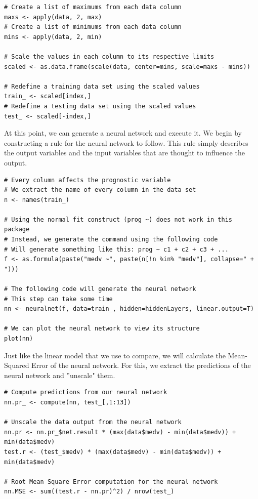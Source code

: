 \documentclass[11pt]{article}
\begin{document}
\begin{lstlisting}
# Create a list of maximums from each data column
maxs <- apply(data, 2, max)
# Create a list of minimums from each data column
mins <- apply(data, 2, min)

# Scale the values in each column to its respective limits
scaled <- as.data.frame(scale(data, center=mins, scale=maxs - mins))

# Redefine a training data set using the scaled values
train_ <- scaled[index,]
# Redefine a testing data set using the scaled values
test_ <- scaled[-index,]
\end{lstlisting}

At this point, we can generate a neural network and execute it. We begin by constructing a rule for the neural network to follow. This rule simply describes the output variables and the input variables that are thought to influence the output. 

\begin{lstlisting}
# Every column affects the prognostic variable
# We extract the name of every column in the data set
n <- names(train_)

# Using the normal fit construct (prog ~) does not work in this package
# Instead, we generate the command using the following code
# Will generate something like this: prog ~ c1 + c2 + c3 + ...
f <- as.formula(paste("medv ~", paste(n[!n %in% "medv"], collapse=" + ")))

# The following code will generate the neural network
# This step can take some time
nn <- neuralnet(f, data=train_, hidden=hiddenLayers, linear.output=T)

# We can plot the neural network to view its structure
plot(nn)
\end{lstlisting}

Just like the linear model that we use to compare, we will calculate the Mean-Squared Error of the neural network. For this, we extract the predictions of the neural network and ''unscale" them. 

\begin{lstlisting}
# Compute predictions from our neural network
nn.pr_ <- compute(nn, test_[,1:13])

# Unscale the data output from the neural network
nn.pr <- nn.pr_$net.result * (max(data$medv) - min(data$medv)) + min(data$medv)
test.r <- (test_$medv) * (max(data$medv) - min(data$medv)) + min(data$medv)

# Root Mean Square Error computation for the neural network
nn.MSE <- sum((test.r - nn.pr)^2) / nrow(test_)
\end{lstlisting}
\end{document}

